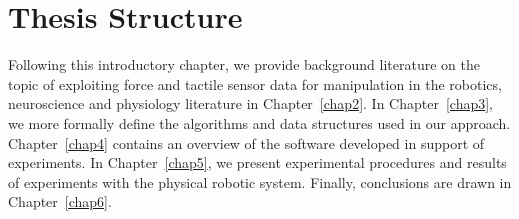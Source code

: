 
\section{Thesis Structure}
Following this introductory chapter, we provide background literature on the topic of exploiting force and tactile sensor data for manipulation in the robotics, neuroscience and physiology literature in Chapter~\ref{chap2}.
In Chapter~\ref{chap3}, we more formally define the algorithms and data structures used in our approach.
Chapter~\ref{chap4} contains an overview of the software developed in support of experiments.
In Chapter~\ref{chap5}, we present experimental procedures and results of experiments with the physical robotic system.
Finally, conclusions are drawn in Chapter~\ref{chap6}.
